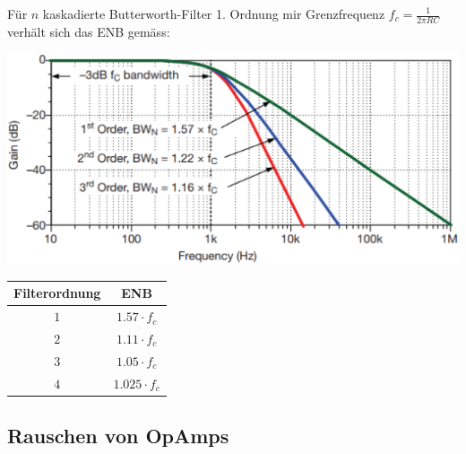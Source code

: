 \vspace{0.2cm}
Für $n$ kaskadierte Butterworth-Filter 1. Ordnung mir Grenzfrequenz $f_c = \frac{1}{2 \pi R C}$ verhält sich das ENB gemäss:

\begin{minipage}[c]{0.6\columnwidth}
    \includegraphics[width=\columnwidth]{images/rausch_bandbreite.png}
\end{minipage}
\hfill
\begin{minipage}[c]{0.38\columnwidth}
    \begin{tabular}{c | c}
        \toprule
        \textbf{Filterordnung}  & \textbf{ENB} \\
        \midrule
        $1$                     & $1.57 \cdot f_c$ \\
        \midrule
        $2$                     & $1.11 \cdot f_c$ \\
        \midrule
        $3$                     & $1.05 \cdot f_c$ \\
        \midrule
        $4$                     & $1.025 \cdot f_c$ \\
        \bottomrule
    \end{tabular}

\end{minipage}


\subsection{Rauschen von OpAmps}
\label{Rauschen von OpAmps}


